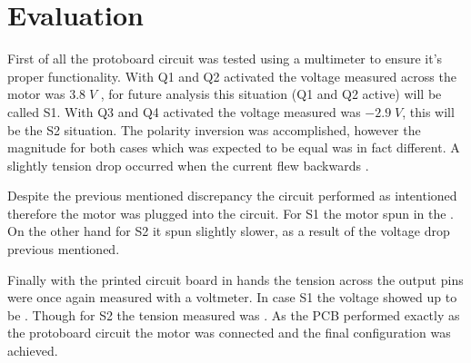 \section{\textbf{Evaluation}}\label{sec:5}

	First of all the protoboard circuit  was tested using a multimeter to ensure it's proper functionality. With Q1 and Q2 activated the voltage measured across the motor was $3.8\;V$ , for future analysis this situation (Q1 and Q2 active) will be called S1. With Q3 and Q4 activated the voltage measured was $-2.9\;V$, this will be the S2 situation. The polarity inversion was accomplished, however the magnitude for both cases which was expected to be equal was in fact different. A slightly tension drop occurred when the current flew backwards . 
	
	Despite the previous mentioned discrepancy the circuit performed as intentioned therefore the motor was plugged into the circuit. For S1 the motor spun in the . On the other hand for S2 it spun  slightly slower, as a result of the voltage drop previous mentioned.
	
	Finally with the printed circuit board in hands the tension across the output pins were once again measured with a voltmeter. In case S1 the voltage showed up to be . Though for S2 the tension measured was . As the PCB performed exactly as the protoboard circuit the motor was connected and the final configuration was achieved. 